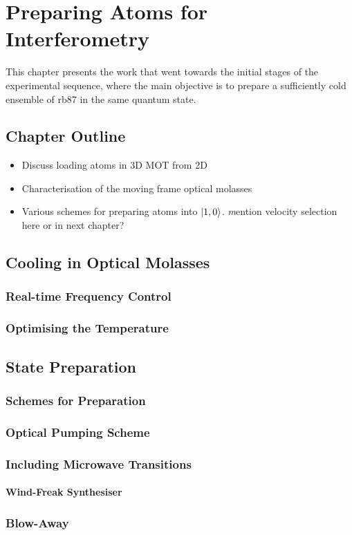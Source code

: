 \chapter{Preparing Atoms for Interferometry}\label{chap:atom_prep}
This chapter presents the work that went towards the initial stages of the experimental sequence, where the main objective is to prepare a sufficiently cold ensemble of \ac{rb87} in the same quantum state.
\section{Chapter Outline}
\begin{itemize}
    \item Discuss loading atoms in 3D MOT from 2D
    \item Characterisation of the moving frame optical molasses
    \item Various schemes for preparing atoms into \(\ket{1,0}\). {\textit mention velocity selection here or in next chapter?}
\end{itemize}

\section{Cooling in Optical Molasses}
\subsection{Real-time Frequency Control}
\subsection{Optimising the Temperature}

\section{State Preparation}\label{sec:state_prep}
\subsection{Schemes for Preparation}
\subsection{Optical Pumping Scheme} 
\subsection{Including Microwave Transitions}
\subsubsection{Wind-Freak Synthesiser}\label{subsec:windfreak}

\subsection{Blow-Away}\label{subsec:blow_away}